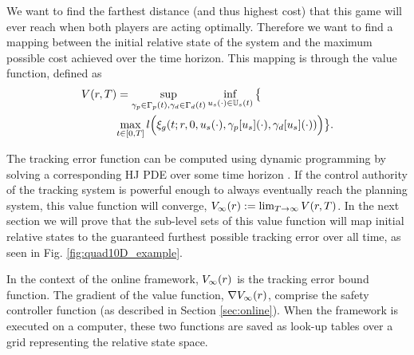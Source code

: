 

We want to find the farthest distance (and thus highest cost) that this game will ever reach when both players are acting optimally. Therefore we want to find a mapping between the initial relative state of the system and the maximum possible cost achieved over the time horizon. This mapping is through the value function, defined as
\begin{equation}
 \begin{aligned}
 \label{eq:valfunc}
 	&V(r,T)= \sup_{\gamma_{p} \in \Gamma_p(t), \gamma_{d} \in \Gamma_d(t)} \inf_{u_s(\cdot) \in \mathbb{U}_s(t)} \big\{\\
  &\quad\qquad \max_{t\in [0, T]} l\Big(\xi_g(t; r, 0, u_s(\cdot), \gamma_p[u_s](\cdot), \gamma_d[u_s](\cdot))\Big)\big\}.
 	\end{aligned}
 \end{equation} 

The tracking error function can be computed using dynamic programming by solving a corresponding HJ PDE over some time horizon \cite{Mitchell05, Fisac15}. If the control authority of the tracking system is powerful enough to always eventually reach the planning system, this value function will converge, $V_\infty(r) := \lim_{T\rightarrow\infty} V(r, T)$. In the next section we will prove that the sub-level sets of this value function will map initial relative states to the guaranteed furthest possible tracking error over all time, as seen in Fig. \ref{fig:quad10D_example}.
 
In the context of the online framework, $V_\infty(r)$ is the tracking error bound function. The gradient of the value function, $\nabla V_\infty(r)$, comprise the safety controller function (as described in Section \ref{sec:online}). When the framework is executed on a computer, these two functions are saved as look-up tables over a grid representing the relative state space.
 

